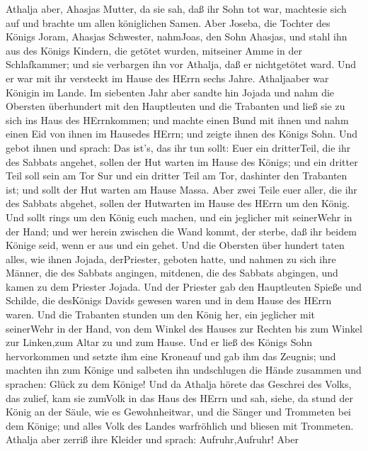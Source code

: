  Athalja aber, Ahasjas Mutter, da sie sah, daß ihr Sohn tot
war, machtesie sich auf und brachte um allen königlichen Samen.
 Aber Joseba, die Tochter des Königs Joram, Ahasjas
Schwester, nahmJoas, den Sohn Ahasjas, und stahl ihn aus des Königs
Kindern, die getötet wurden, mitseiner Amme in der Schlafkammer; und sie
verbargen ihn vor Athalja, daß er nichtgetötet ward.  Und er
war mit ihr versteckt im Hause des HErrn sechs Jahre. Athaljaaber war
Königin im Lande.  Im siebenten Jahr aber sandte hin Jojada
und nahm die Obersten überhundert mit den Hauptleuten und die Trabanten
und ließ sie zu sich ins Haus des HErrnkommen; und machte einen Bund mit
ihnen und nahm einen Eid von ihnen im Hausedes HErrn; und zeigte ihnen
des Königs Sohn.  Und gebot ihnen und sprach: Das ist's, das
ihr tun sollt: Euer ein dritterTeil, die ihr des Sabbats angehet, sollen
der Hut warten im Hause des Königs;  und ein dritter Teil
soll sein am Tor Sur und ein dritter Teil am Tor, dashinter den
Trabanten ist; und sollt der Hut warten am Hause Massa. 
Aber zwei Teile euer aller, die ihr des Sabbats abgehet, sollen der
Hutwarten im Hause des HErrn um den König.  Und sollt rings
um den König euch machen, und ein jeglicher mit seinerWehr in der Hand;
und wer herein zwischen die Wand kommt, der sterbe, daß ihr beidem
Könige seid, wenn er aus und ein gehet.  Und die Obersten
über hundert taten alles, wie ihnen Jojada, derPriester, geboten hatte,
und nahmen zu sich ihre Männer, die des Sabbats angingen, mitdenen, die
des Sabbats abgingen, und kamen zu dem Priester Jojada. 
Und der Priester gab den Hauptleuten Spieße und Schilde, die desKönigs
Davids gewesen waren und in dem Hause des HErrn waren.  Und
die Trabanten stunden um den König her, ein jeglicher mit seinerWehr in
der Hand, von dem Winkel des Hauses zur Rechten bis zum Winkel zur
Linken,zum Altar zu und zum Hause.  Und er ließ des Königs
Sohn hervorkommen und setzte ihm eine Kroneauf und gab ihm das Zeugnis;
und machten ihn zum Könige und salbeten ihn undschlugen die Hände
zusammen und sprachen: Glück zu dem Könige!  Und da Athalja
hörete das Geschrei des Volks, das zulief, kam sie zumVolk in das Haus
des HErrn  und sah, siehe, da stund der König an der Säule,
wie es Gewohnheitwar, und die Sänger und Trommeten bei dem Könige; und
alles Volk des Landes warfröhlich und bliesen mit Trommeten. Athalja
aber zerriß ihre Kleider und sprach: Aufruhr,Aufruhr!  Aber
